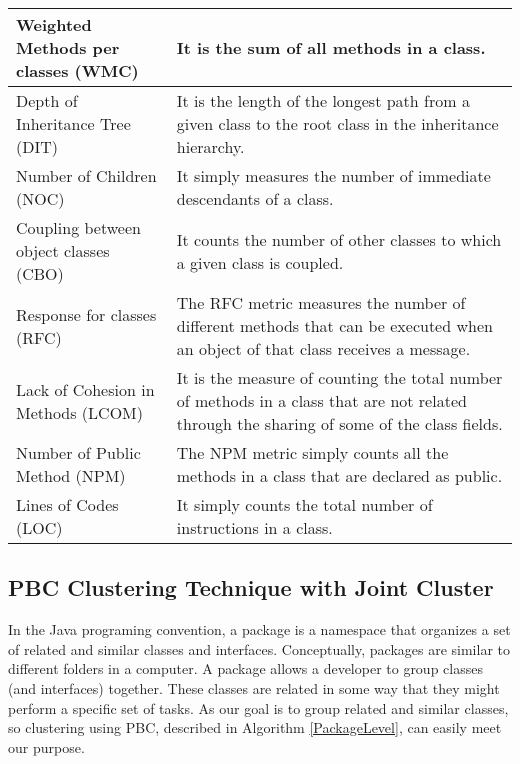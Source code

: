 \documentclass[12pt]{report}
\begin{document}
\begin{center}

\label{ExplanatoryVariable}
    \begin{tabular}{| p{6cm}  |p{9cm}|}
    \hline
    Weighted Methods per classes (WMC) & It is the sum of all methods in a class. \\ \hline
    Depth of Inheritance Tree (DIT) &  It is the length of the longest path from a given class to the root class in the inheritance hierarchy. \\ \hline
    Number of Children (NOC)  & It simply measures the number of immediate descendants of a class. \\ \hline
    Coupling between object classes (CBO) & It counts the number of other classes to which a given class is coupled. \\
    \hline
		Response for classes (RFC) & The RFC metric measures the number of different methods that can be executed when an object of that class receives a message.\\ \hline
		Lack of Cohesion in Methods (LCOM) & It is the measure of counting the total number of methods in a class that are not related through the sharing of some of the class fields.\\ \hline
		Number of Public Method (NPM) & The NPM metric simply counts all the methods in a class that are declared as public.\\ \hline
		Lines of Codes (LOC)& It simply counts the total number of instructions in a class. \\ \hline 
    \end{tabular}
	\end{center}


\subsection{PBC Clustering Technique with Joint Cluster}

In the Java programing convention, a package is a namespace that organizes a set of related and similar classes and interfaces. Conceptually, packages are similar to different folders in a computer. A package allows a developer to group classes (and interfaces) together. These classes are related in some way that they might perform a specific set of tasks. As our goal is to group related and similar classes, so clustering using PBC, described in  Algorithm \ref{PackageLevel}, can easily meet our purpose.
\end{document}
